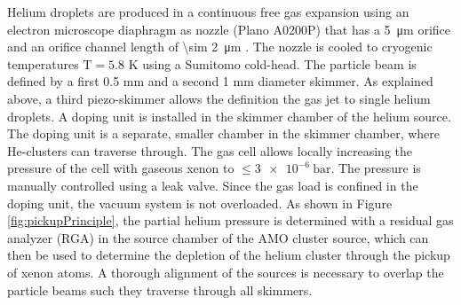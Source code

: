 Helium droplets are produced in a continuous free gas expansion using an electron microscope diaphragm as nozzle (Plano A0200P) that has a \SI{5}{\micro\meter} orifice and an orifice channel length of \SI{\sim 2}{\micro\meter} \citep{Gomez-2011-JCP}. The nozzle is cooled to cryogenic temperatures $\text{T}= 5.8$ K using a Sumitomo cold-head. The particle beam is defined by a first 0.5 mm and a second 1 mm diameter skimmer. As explained above, a third piezo-skimmer allows the definition the gas jet to single helium droplets. A doping unit is installed in the skimmer chamber of the helium source. The doping unit is a separate, smaller chamber in the skimmer chamber, where He-clusters can traverse through. The gas cell allows locally increasing the pressure of the cell with gaseous xenon to $\leq \SI{3e-6}{\bar}$. The pressure is manually controlled using a leak valve. Since the gas load is confined in the doping unit, the vacuum system is not overloaded. As shown in Figure \ref{fig:pickupPrinciple}, the partial helium pressure is determined with a residual gas analyzer (RGA) in the source chamber of the AMO cluster source, which can then be used to determine the depletion of the helium cluster through the pickup of xenon atoms. A thorough alignment of the sources is necessary to overlap the particle beams such they traverse through all skimmers.%
%
%
%
